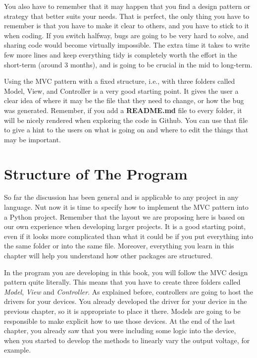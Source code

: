 You also have to remember that it may happen that you find a design
pattern or strategy that better suits your needs. That is perfect, the
only thing you have to remember is that you have to make it clear to
others, and you have to stick to it when coding. If you switch halfway,
bugs are going to be very hard to solve, and sharing code would become
virtually impossible. The extra time it takes to write few more lines
and keep everything tidy is completely worth the effort in the
short-term (around 3 months), and is going to be crucial in the mid
to long-term.

Using the {MVC} pattern with a fixed structure, i.e., with three folders
called Model, View, and Controller is a very good starting point. It
gives the user a clear idea of where it may be the file that they need
to change, or how the bug was generated. Remember, if you add a
\textbf{{README}.md} file to every folder, it will be nicely rendered
when exploring the code in Github. You can use that file to give a hint
to the users on what is going on and where to edit the things that may
be important.

\section{Structure of The Program}\label{structure-of-theprogram}
So far the discussion has been general and is applicable to any project
in any language. Nut now it is time to specify how to implement the
{MVC} pattern into a Python project. Remember that the layout we are
proposing here is based on our own experience when developing larger
projects. It is a good starting point, even if it looks more complicated
than what it could be if you put everything into the same folder or into
the same file. Moreover, everything you learn in this chapter will help
you understand how other packages are structured.

In the program you are developing in this book, you will follow the
{MVC} design pattern quite literally. This means that you have to create
three folders called \emph{Model}, \emph{View} and
\emph{Controller}. As explained before, controllers are going to host
the drivers for your devices. You already developed the driver for your
device in the previous chapter, so it is appropriate to place it there.
Models are going to be responsible to make explicit how to use those
devices. At the end of the last chapter, you already saw that you were
including some logic into the device, when you started to develop the
methods to linearly vary the output voltage, for example.

